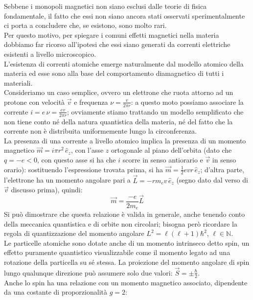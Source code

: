 \documentclass[]{article}
\begin{document}
Sebbene i monopoli magnetici non siano esclusi dalle teorie di fisica fondamentale, il fatto che essi non siano ancora stati osservati sperimentalmente ci porta a concludere che, se esistono, sono molto rari. \\ 
Per questo motivo, per spiegare i comuni effetti magnetici nella materia dobbiamo far ricorso all'ipotesi che essi siano generati da correnti elettriche esistenti a livello microscopico. \\ 
%
L'esistenza di correnti atomiche emerge naturalmente dal modello atomico della materia ed esse sono alla base del comportamento diamagnetico di tutti i materiali. \\ 
%
Consideriamo un caso semplice, ovvero un elettrone che ruota attorno ad un protone con velocità $ \vec{v} $ e frequenza $ \nu = \frac{v}{2\pi r} $: a questo moto possiamo associare la corrente $ i = e\,\nu = \frac{ev}{2\pi r} $; ovviamente stiamo trattando un modello semplificato che non tiene conto né della natura quantistica della materia, né del fatto che la corrente non è distribuita uniformemente lungo la circonferenza. \\ 
La presenza di una corrente a livello atomico implica la presenza di un momento magnetico $ \vec{m} = i \pi r^2 \,\hat{e}_z $, con l'asse $ z $ ortogonale al piano dell'orbita (dato che $ q = -e < 0 $, con questo asse si ha che $ i $ scorre in senso antiorario e $ \vec{v} $ in senso orario): sostituendo l'espressione trovata prima, si ha $ \vec{m} = \frac{1}{2} evr \,\hat{e}_z $; d'altra parte, l'elettrone ha un momento angolare pari a $ \vec{L} = - r m_e v \,\hat{e}_z  $ (segno dato dal verso di $ \vec{v} $ discusso prima), quindi:
\begin{equation}
	\vec{m} = \frac{-e}{2m_e}\vec{L}
	\label{eq:1}
\end{equation}
Si può dimostrare che questa relazione è valida in generale, anche tenendo conto della meccanica quantistica e di orbite non circolari; bisogna però ricordare la regola di quantizzazione del momento angolare $ L^2 = \ell(\ell+1)\hbar^2 $, $ \ell \in \mathbb{N} $. \\ 
%
Le particelle atomiche sono dotate anche di un momento intrinseco detto spin, un effetto puramente quantistico visualizzabile come il momento legato ad una rotazione della particella su sé stessa. La proiezione del momento angolare di spin lungo qualunque direzione può assumere solo due valori: $ \vec{S} = \pm \frac{\hbar}{2} $. \\ 
Anche lo spin ha una relazione con un momento magnetico associato, dipendente da una costante di proporzionalità $ g = 2 $:
\end{document}
